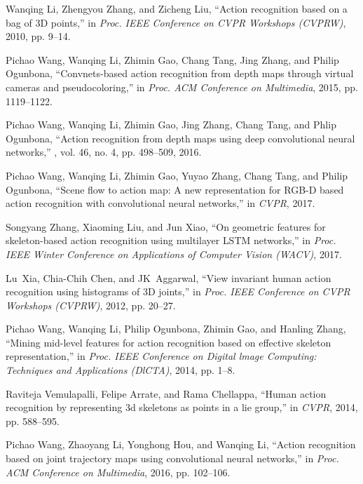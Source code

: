 \documentclass[5pt]{article}
\begin{document}
\begin{thebibliography}{10}

Wanqing Li, Zhengyou Zhang, and Zicheng Liu,
\newblock ``Action recognition based on a bag of {3D} points,''
\newblock in {\em Proc. IEEE Conference on CVPR Workshops (CVPRW)}, 2010, pp.
  9--14.

Pichao Wang, Wanqing Li, Zhimin Gao, Chang Tang, Jing Zhang, and Philip
  Ogunbona,
\newblock ``Convnets-based action recognition from depth maps through virtual
  cameras and pseudocoloring,''
\newblock in {\em Proc. ACM Conference on Multimedia}, 2015, pp. 1119--1122.

Pichao Wang, Wanqing Li, Zhimin Gao, Jing Zhang, Chang Tang, and Phlip
  Ogunbona,
\newblock ``Action recognition from depth maps using deep convolutional neural
  networks,''
, vol. 46, no. 4, pp.
  498--509, 2016.

Pichao Wang, Wanqing Li, Zhimin Gao, Yuyao Zhang, Chang Tang, and Philip
  Ogunbona,
\newblock ``Scene flow to action map: A new representation for {RGB-D} based
  action recognition with convolutional neural networks,''
\newblock in {\em CVPR}, 2017.

Songyang Zhang, Xiaoming Liu, and Jun Xiao,
\newblock ``On geometric features for skeleton-based action recognition using
  multilayer {LSTM} networks,''
\newblock in {\em Proc. IEEE Winter Conference on Applications of Computer
  Vision (WACV)}, 2017.

Lu~Xia, Chia-Chih Chen, and JK~Aggarwal,
\newblock ``View invariant human action recognition using histograms of {3D}
  joints,''
\newblock in {\em Proc. IEEE Conference on CVPR Workshops (CVPRW)}, 2012, pp.
  20--27.

Pichao Wang, Wanqing Li, Philip Ogunbona, Zhimin Gao, and Hanling Zhang,
\newblock ``Mining mid-level features for action recognition based on effective
  skeleton representation,''
\newblock in {\em Proc. IEEE Conference on Digital lmage Computing: Techniques
  and Applications (DlCTA)}, 2014, pp. 1--8.

Raviteja Vemulapalli, Felipe Arrate, and Rama Chellappa,
\newblock ``Human action recognition by representing 3d skeletons as points in
  a lie group,''
\newblock in {\em CVPR}, 2014, pp. 588--595.

Pichao Wang, Zhaoyang Li, Yonghong Hou, and Wanqing Li,
\newblock ``Action recognition based on joint trajectory maps using
  convolutional neural networks,''
\newblock in {\em Proc. ACM Conference on Multimedia}, 2016, pp. 102--106.


\end{thebibliography}
\end{document}
